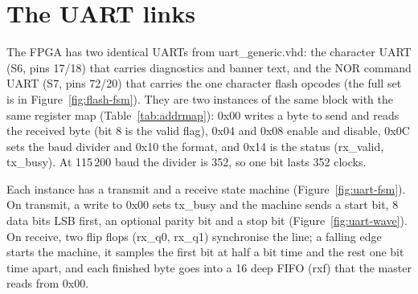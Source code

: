 \documentclass[a4paper,10pt]{article}
\begin{document}
\section{The UART links}
\label{sec:uart}

The FPGA has two identical UARTs from uart\_generic.vhd: the character UART (S6,
pins 17/18) that carries diagnostics and banner text, and the NOR command UART (S7, pins
72/20) that carries the one character flash opcodes (the full set is in
Figure~\ref{fig:flash-fsm}). They are two instances of the same
block with the same register map (Table~\ref{tab:addrmap}): 0x00 writes a byte to
send and reads the received byte (bit 8 is the valid flag), 0x04 and 0x08
enable and disable, 0x0C sets the baud divider and 0x10 the format, and
0x14 is the status (rx\_valid, tx\_busy). At 115\,200 baud the
divider is 352, so one bit lasts 352 clocks.

Each instance has a transmit and a receive state machine (Figure~\ref{fig:uart-fsm}). On
transmit, a write to 0x00 sets tx\_busy and the machine sends a start
bit, 8 data bits LSB first, an optional parity bit and a stop bit
(Figure~\ref{fig:uart-wave}). On receive, two flip flops (rx\_q0,
rx\_q1) synchronise the line; a falling edge starts the machine, it samples the
first bit at half a bit time and the rest one bit time apart, and each finished byte goes
into a 16 deep FIFO (rxf) that the master reads from 0x00.
\end{document}
